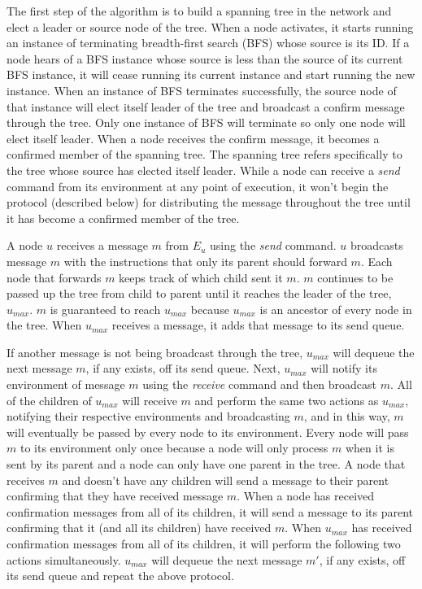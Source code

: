 \documentclass[english]{article}
\begin{document}
The first step of the algorithm is to build a spanning tree in the network and elect a leader or source node of the tree. When a node activates, it starts running an instance of terminating breadth-first search (BFS) whose source is its ID. If a node hears of a BFS instance whose source is less than the source of its current BFS instance, it will cease running its current instance and start running the new instance. When an instance of BFS terminates successfully, the source node of that instance will elect itself leader of the tree and broadcast a confirm message through the tree. Only one instance of BFS will terminate so only one node will elect itself leader. When a node receives the confirm message, it becomes a confirmed member of the spanning tree. The spanning tree refers specifically to the tree whose source has elected itself leader. While a node can receive a \textit{send} command from its environment at any point of execution, it won't begin the protocol (described below) for distributing the message throughout the tree until it has become a confirmed member of the tree.


A node $u$ receives a message $m$ from $E_u$ using the \textit{send} command. $u$ broadcasts message $m$ with the instructions that only its parent should forward $m$. Each node that forwards $m$ keeps track of which child sent it $m$. $m$ continues to be passed up the tree from child to parent until it reaches the leader of the tree, $u_{max}$. $m$ is guaranteed to reach $u_{max}$ because $u_{max}$ is an ancestor of every node in the tree. When $u_{max}$ receives a message, it adds that message to its send queue.


If another message is not being broadcast through the tree, $u_{max}$ will dequeue the next message $m$, if any exists, off its send queue. Next, $u_{max}$ will notify its environment of message $m$ using the \textit{receive} command and then broadcast $m$. All of the children of $u_{max}$ will receive $m$ and perform the same two actions as $u_{max}$, notifying their respective environments and broadcasting $m$, and in this way, $m$ will eventually be passed by every node to its environment. Every node will pass $m$ to its environment only once because a node will only process $m$ when it is sent by its parent and a node can only have one parent in the tree. A node that receives $m$ and doesn't have any children will send a message to their parent confirming that they have received message $m$. When a node has received confirmation messages from all of its children, it will send a message to its parent confirming that it (and all its children) have received $m$. When $u_{max}$ has received confirmation messages from all of its children, it will perform the following two actions simultaneously. $u_{max}$ will dequeue the next message $m'$, if any exists, off its send queue and repeat the above protocol. 
\end{document}
